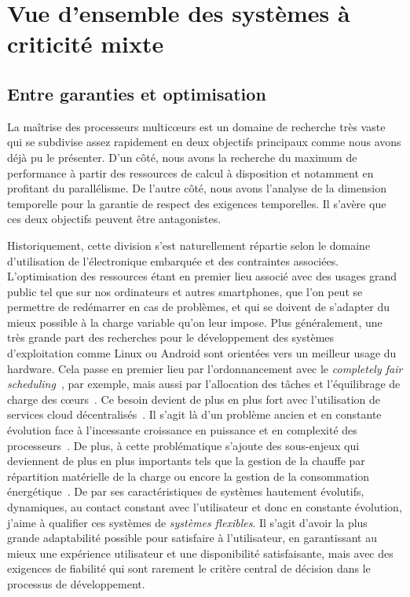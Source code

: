 \documentclass[french, a4paper, 11pt, twoside, pdftex]{StyleThese}
\begin{document}
\section{Vue d'ensemble des systèmes à criticité mixte}
    \subsection{Entre garanties et optimisation}
    La maîtrise des processeurs multicœurs est un domaine de recherche très vaste qui se subdivise assez rapidement en deux objectifs principaux comme nous avons déjà pu le présenter. D'un côté, nous avons la recherche du maximum de performance à partir des ressources de calcul à disposition et notamment en profitant du parallélisme. De l'autre côté, nous avons l'analyse de la dimension temporelle pour la garantie de respect des exigences temporelles. Il s'avère que ces deux objectifs peuvent être antagonistes.
    
    Historiquement, cette division s'est naturellement répartie selon le domaine d'utilisation de l'électronique embarquée et des contraintes associées. L'optimisation des ressources étant en premier lieu associé avec des usages grand public tel que sur nos ordinateurs et autres smartphones, que l'on peut se permettre de redémarrer en cas de problèmes, et qui se doivent de s'adapter du mieux possible à la charge variable qu'on leur impose. Plus généralement, une très grande part des recherches pour le développement des systèmes d'exploitation comme Linux ou Android sont orientées vers un meilleur usage du hardware. Cela passe en premier lieu par l'ordonnancement avec le \textit{completely fair scheduling}~\cite{pabla_completely_2009}, \cite{pricopi_task_2014} par exemple, mais aussi par l'allocation des tâches et l'équilibrage de charge des cœurs~\cite{pathania_distributed_2016}. Ce besoin devient de plus en plus fort avec l'utilisation de services cloud décentralisés~\cite{walsh_utility_2004}. Il s'agit là d'un problème ancien et en constante évolution face à l'incessante croissance en puissance et en complexité des processeurs~\cite{lozi_linux_2016}. De plus, à cette problématique s'ajoute des sous-enjeux qui deviennent de plus en plus importants tels que la gestion de la chauffe par répartition matérielle de la charge ou encore la gestion de la consommation énergétique~\cite{li_optimizing_2016}. De par ses caractéristiques de systèmes hautement évolutifs, dynamiques, au contact constant avec l'utilisateur et donc en constante évolution, j'aime à qualifier ces systèmes de \textit{systèmes flexibles}. Il s'agit d'avoir la plus grande adaptabilité possible pour satisfaire à l'utilisateur, en garantissant au mieux une expérience utilisateur et une disponibilité satisfaisante, mais avec des exigences de fiabilité qui sont rarement le critère central de décision dans le processus de développement.
        
\end{document}
